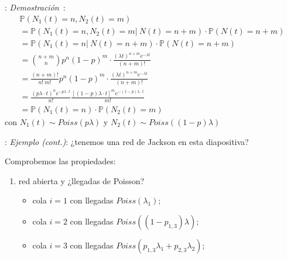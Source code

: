 \documentclass[xcolor={x11names}]{beamer}
\newcommand{\cmark}{\ding{51}}%
\begin{document}
\begin{frame}{\secname: \subsecname}
    \textit{Demostración}~\cite{amable}:
    \begin{multline*}
        \mathbb{P}(N_1(t)=n,N_2(t)=m)\\
        =\mathbb{P}(N_1(t)=n,N_2(t)=m|\ N(t)=n+m)\cdot \mathbb{P}(N(t)=n+m)\\
        =\mathbb{P}(N_1(t)=n|\ N(t)=n+m)\cdot \mathbb{P}(N(t)=n+m)\\
        ={n+m\choose n}p^n(1-p)^m\cdot 
        \frac{(\lambda t)^{n+m}e^{-\lambda t}}{(n+m)!}\\
        =\frac{(n+m)!}{n!\ m!}p^n(1-p)^m\cdot 
        \frac{(\lambda t)^{n+m}e^{-\lambda t}}{(n+m)!}\\
        =\frac{(p\lambda\cdot t)^n e^{-p\lambda\cdot t}}{n!}
        \frac{[(1-p)\lambda\cdot t]^m e^{-(1-p)\lambda\cdot t}}{m!}\\
        = \mathbb{P}(N_1(t)=n)\cdot \mathbb{P}(N_2(t)=m)
    \end{multline*}
    con $N_1(t)\sim Poiss(p\lambda)$
    y $N_2(t)\sim Poiss((1-p)\lambda)$
\end{frame}


\begin{frame}{\secname: \subsecname}
    \textit{Ejemplo (cont.)}: ¿tenemos una red
    de Jackson en esta diapositiva?

    \begin{figure}
        \resizebox{.7\textwidth}{!}{%
            
        }
    \end{figure}

    Comprobemos las propiedades:
    \begin{enumerate}
        \item \cmark red abierta y
            ¿llegadas de Poisson?

            \begin{itemize}
                \item \cmark
                    cola $i=1$ con llegadas
                    $Poiss(\lambda_1)$;
                \item \cmark
                    cola $i=2$ con llegadas
                    $Poiss\left((1-p_{1,3})\lambda\right)$;
                \item \cmark
                    cola $i=3$ con llegadas
                    $Poiss\left(p_{1,3}\lambda_1+p_{2,3}\lambda_2\right)$;
            \end{itemize}
    \end{enumerate}
\end{frame}
\end{document}
